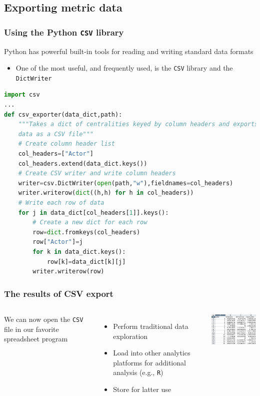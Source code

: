 \documentclass[xcolor=dvipsnames, 9pt]{beamer}
\begin{document}

\subsection{Exporting metric data} %
\label{sub:exporting_metric_data}

\begin{frame}[fragile]
    \frametitle{Using the Python \texttt{CSV} library}
    Python has powerful built-in tools for reading and writing standard data formats
    \begin{itemize}
        \item One of the most useful, and frequently used, is the \texttt{CSV} library and the \texttt{DictWriter}
    \end{itemize}
    \begin{block}{}
        \scriptsize{\begin{lstlisting}[language=Python]
import csv
...
def csv_exporter(data_dict,path):
    """Takes a dict of centralities keyed by column headers and exports 
    data as a CSV file"""
    # Create column header list
    col_headers=["Actor"]
    col_headers.extend(data_dict.keys())
    # Create CSV writer and write column headers
    writer=csv.DictWriter(open(path,"w"),fieldnames=col_headers)
    writer.writerow(dict((h,h) for h in col_headers))
    # Write each row of data
    for j in data_dict[col_headers[1]].keys():
        # Create a new dict for each row
        row=dict.fromkeys(col_headers)
        row["Actor"]=j
        for k in data_dict.keys():
            row[k]=data_dict[k][j]
        writer.writerow(row)
        \end{lstlisting}}
    \end{block}
\end{frame}

\begin{frame}[fragile]
    \frametitle{The results of CSV export}
    \begin{columns}
        We can now open the \texttt{CSV} file in our favorite spreadsheet program
        \begin{itemize}
            \item Perform traditional data exploration
            \item Load into other analytics platforms for additional analysis (e.g., \texttt{R})
            \item Store for latter use
        \end{itemize}
        \includegraphics[width=5.5cm]{../images/figures/metrics_screen_shot.png}
    \end{columns}
\end{frame}
\end{document}
